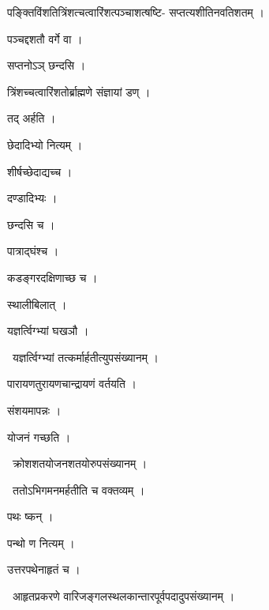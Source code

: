\documentclass[10pt, openany, oneside]{book}
\begin{document}
\noindent पङ्क्तिविंशतित्रिंशत्चत्वारिंशत्पञ्चाशत्षष्टि- सप्तत्यशीतिनवतिशतम् ।

\noindent पञ्चद्दशतौ वर्गे वा ।

\noindent सप्तनोऽञ् छन्दसि ।

\noindent त्रिंशच्चत्वारिंशतोर्ब्राह्मणे संज्ञायां डण् ।

\noindent तद् अर्हति ।

\noindent छेदादिभ्यो नित्यम् ।

\noindent शीर्षच्छेदाद्यच्च ।

\noindent दण्डादिभ्यः ।

\noindent छन्दसि च ।

\noindent पात्राद्घंश्च ।

\noindent कडङ्गरदक्षिणाच्छ च ।

\noindent स्थालीबिलात् ।

\noindent यज्ञर्त्विग्भ्यां घखञौ ।

\par\noindent\hspace{1.5em}{\vps वा॰}~{\qt यज्ञर्त्विग्भ्यां तत्कर्मार्हतीत्युपसंख्यानम् ।}

\noindent पारायणतुरायणचान्द्रायणं वर्तयति ।

\noindent संशयमापन्नः ।

\noindent योजनं गच्छति ।

\par\noindent\hspace{1.5em}{\vps वा॰}~{\qt क्रोशशतयोजनशतयोरुपसंख्यानम् ।}

\par\noindent\hspace{1.5em}{\vps वा॰}~{\qt ततोऽभिगमनमर्हतीति च वक्तव्यम् ।}

\noindent पथः ष्कन् ।

\noindent पन्थो ण नित्यम् ।

\noindent उत्तरपथेनाहृतं च ।

\par\noindent\hspace{1.5em}{\vps वा॰}~{\qt आहृतप्रकरणे वारिजङ्गलस्थलकान्तारपूर्वपदादुपसंख्यानम् ।}
\end{document}
